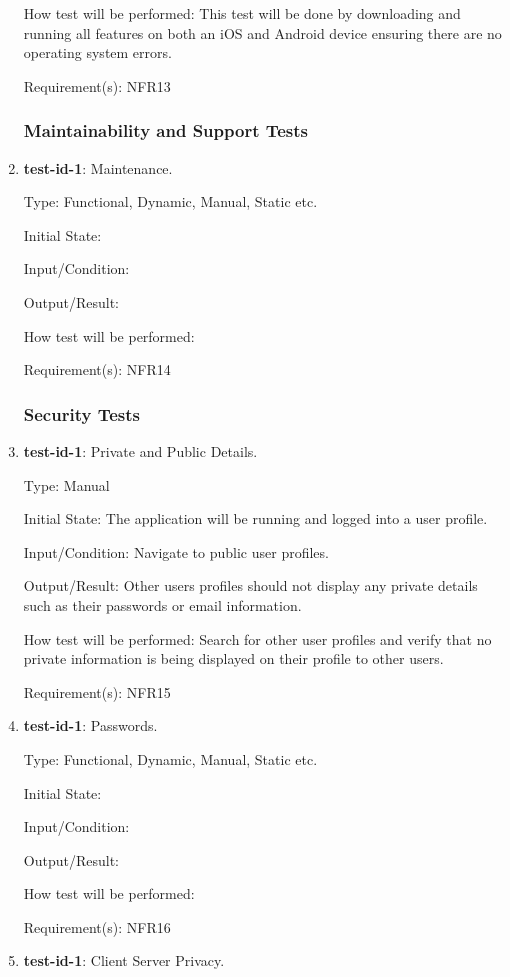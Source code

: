 \documentclass[12pt, titlepage]{article}
\begin{document}
\begin{enumerate}
		How test will be performed: This test will be done by downloading and running all features on both an iOS and Android device ensuring there are no operating system errors.
		
		Requirement(s): NFR13
	\subsubsection{Maintainability and Support Tests}
		\item{\textbf{test-id-1}}: Maintenance.
		
		Type: Functional, Dynamic, Manual, Static etc.
		
		Initial State: 
		
		Input/Condition: 
		
		Output/Result: 
		
		How test will be performed: 
		
		Requirement(s): NFR14
	\subsubsection{Security Tests}
		\item{\textbf{test-id-1}}: Private and Public Details.
		
		Type: Manual
		
		Initial State: The application will be running and logged into a user profile. 
		
		Input/Condition: Navigate to public user profiles.
		
		Output/Result: Other users profiles should not display any private details such as their passwords or email information. 
		
		How test will be performed: Search for other user profiles and verify that no private information is being displayed on their profile to other users.
		
		Requirement(s): NFR15
		
		\item{\textbf{test-id-1}}: Passwords.
		
		Type: Functional, Dynamic, Manual, Static etc.
		
		Initial State: 
		
		Input/Condition: 
		
		Output/Result: 
		
		How test will be performed: 
		
		Requirement(s): NFR16
		
		\item{\textbf{test-id-1}}: Client Server Privacy.
		

\end{enumerate}
\end{document}
